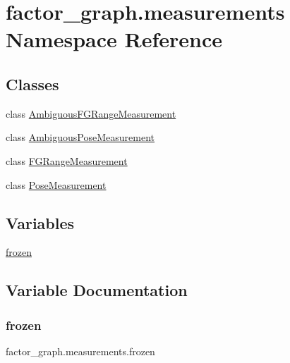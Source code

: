 \hypertarget{namespacefactor__graph_1_1measurements}{}\section{factor\+\_\+graph.\+measurements Namespace Reference}
\label{namespacefactor__graph_1_1measurements}
\subsection*{Classes}
\begin{DoxyCompactItemize}
\item
class \hyperlink{classfactor__graph_1_1measurements_1_1AmbiguousFGRangeMeasurement}{Ambiguous\+F\+G\+Range\+Measurement}
\item
class \hyperlink{classfactor__graph_1_1measurements_1_1AmbiguousPoseMeasurement}{Ambiguous\+Pose\+Measurement}
\item
class \hyperlink{classfactor__graph_1_1measurements_1_1FGRangeMeasurement}{F\+G\+Range\+Measurement}
\item
class \hyperlink{classfactor__graph_1_1measurements_1_1PoseMeasurement}{Pose\+Measurement}
\end{DoxyCompactItemize}
\subsection*{Variables}
\begin{DoxyCompactItemize}
\item
\hyperlink{namespacefactor__graph_1_1measurements_ac987926c70ea8b010a9b5e1cd05c5d55}{frozen}
\end{DoxyCompactItemize}


\subsection{Variable Documentation}
\mbox{\label{namespacefactor__graph_1_1measurements_ac987926c70ea8b010a9b5e1cd05c5d55}}
\subsubsection{\texorpdfstring{frozen}{frozen}}
{\footnotesize\ttfamily factor\+\_\+graph.\+measurements.\+frozen}
